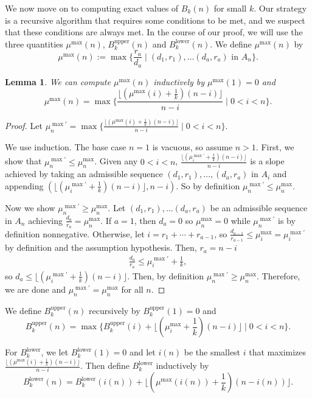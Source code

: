 \documentclass[11pt,reqno]{amsart}
\theoremstyle{plain}
\newtheorem{lemma}[theorem]{Lemma}
\theoremstyle{definition}
\theoremstyle{remark}
\numberwithin{equation}{section}
\numberwithin{equation}{section}
\newcommand{\up}{\textrm{upper}}
\newcommand{\low}{\textrm{lower}}
\begin{document}
We now move on to computing exact values of $B_k(n)$ for small $k$. Our strategy is a recursive algorithm that requires some conditions to be met, and we suspect that these conditions are always met. In the course of our proof, we will use the three quantities $\mu^{\max}(n)$, $B_k^{\up}(n)$ and $B_k^{\low}(n)$. We define $\mu^{\max}(n)$ by
\[ \mu^{\max}(n) := \max\{\frac{r_a}{d_a}\mid (d_1,r_1),\ldots(d_a,r_a)\text{ in }A_n\}. \]

\begin{lemma}
\label{lem:muMaxComputation}
We can compute $\mu^{\max}(n)$ inductively by $\mu^{\max}(1) = 0$ and
\[ \mu^{\max}(n) = \max\{\frac{\lfloor(\mu^{\max}(i)+\frac{1}{k})(n-i)\rfloor}{n-i}\mid 0<i<n\} .\]
\end{lemma}
\begin{proof}
Let $\mu^{\max'}_n = \max\{\frac{\lfloor(\mu^{\max}(i)+\frac{1}{k})(n-i)\rfloor}{n-i}\mid 0<i<n\}$.

We use induction. The base case $n=1$ is vacuous, so assume $n>1$. First, we show that $\mu^{\max\prime}_n\leq \mu^{\max}_n$. Given any $0<i<n$, $\frac{\lfloor(\mu^{\max\prime}_i+\frac{1}{k})(n-i)\rfloor}{n-i}$ is a slope achieved by taking an admissible sequence $(d_1,r_1),\ldots,(d_a,r_a)$ in $A_i$ and appending $(\lfloor(\mu^{\max\prime}_i+\frac{1}{k})(n-i)\rfloor,n-i)$. So by definition $\mu^{\max\prime}_n\leq \mu^{\max}_n$.

Now we show $\mu^{\max\prime}_n\geq \mu^{\max}_n$. Let $(d_1,r_1),\ldots(d_a,r_a)$ be an admissible sequence in $A_n$ achieving $\frac{d_a}{r_a}= \mu^{\max}_n$. If $a=1$, then $d_a=0$ so $\mu^{\max}_n=0$ while $\mu^{\max\prime}_n$ is by definition nonnegative. Otherwise, let $i=r_1+\cdots+r_{a-1}$, so $\frac{d_{a-1}}{r_{a-1}}\leq \mu^{\max}_i=\mu^{\max\prime}_i$ by definition and the assumption hypothesis. Then, $r_a = n-i$
\begin{align*}
    \frac{d_a}{r_a}\leq \mu^{\max\prime}_i+\frac{1}{k},
\end{align*}
so $d_a\leq \lfloor(\mu^{\max\prime}_i+\frac{1}{k})(n-i)\rfloor$. Then, by definition $\mu^{\max\prime}_n\geq \mu^{\max}_n$. Therefore, we are done and $\mu^{\max\prime}_n=\mu^{\max}_n$ for all $n$.
\end{proof}

We define $B_k^{\up}(n)$ recursively by $B_k^{\up}(1) = 0$ and
\[ B_k^{\up}(n) = \max\{B_k^{\up}(i)+\lfloor(\mu^{\max}_i+\frac{1}{k})(n-i)\rfloor\mid 0<i<n\} .\]

For $B_k^{\low}$, we let $B_k^{\low}(1) = 0$ and let $i(n)$ be the smallest $i$ that maximizes $\frac{\lfloor(\mu^{\max}(i)+\frac{1}{k})(n-i)\rfloor}{n-i}$. Then define $B_k^{\low}$ inductively by
\[ B_k^{\low}(n)=B_k^{\low}(i(n))+\lfloor(\mu^{\max}(i(n))+\frac{1}{k})(n-i(n))\rfloor.  \]
\end{document}
